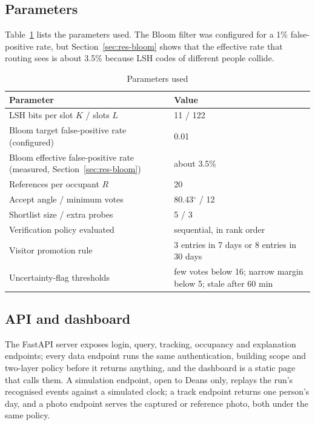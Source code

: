 \documentclass[12pt,a4paper,oneside]{report}
\begin{document}
\subsection{Parameters}
Table~\ref{tab:params} lists the parameters used. The Bloom filter was configured for a 1\% false-positive rate, but Section~\ref{sec:res-bloom} shows that the effective rate that routing sees is about 3.5\% because LSH codes of different people collide.

\begin{table}[htbp]
\centering
\caption{Parameters used}\label{tab:params}
{\small\setlength{\tabcolsep}{4pt}\renewcommand{\arraystretch}{1.2}
\begin{tabular}{|p{7.39cm}|p{7.19cm}|}\hline
\textbf{Parameter} & \textbf{Value}\\\hline
LSH bits per slot $K$ / slots $L$ & 11 / 122\\\hline
Bloom target false-positive rate (configured) & 0.01\\\hline
Bloom effective false-positive rate (measured, Section~\ref{sec:res-bloom}) & about 3.5\%\\\hline
References per occupant $R$ & 20\\\hline
Accept angle / minimum votes & 80.43$^{\circ}$ / 12\\\hline
Shortlist size / extra probes & 5 / 3\\\hline
Verification policy evaluated & sequential, in rank order\\\hline
Visitor promotion rule & 3 entries in 7 days or 8 entries in 30 days\\\hline
Uncertainty-flag thresholds & few votes below 16; narrow margin below 5; stale after 60 min\\\hline
\end{tabular}}
\end{table}

\subsection{API and dashboard}
The FastAPI server exposes login, query, tracking, occupancy and explanation endpoints; every data endpoint runs the same authentication, building scope and two-layer policy before it returns anything, and the dashboard is a static page that calls them. A simulation endpoint, open to Deans only, replays the run's recognised events against a simulated clock; a track endpoint returns one person's day, and a photo endpoint serves the captured or reference photo, both under the same policy.
\end{document}
